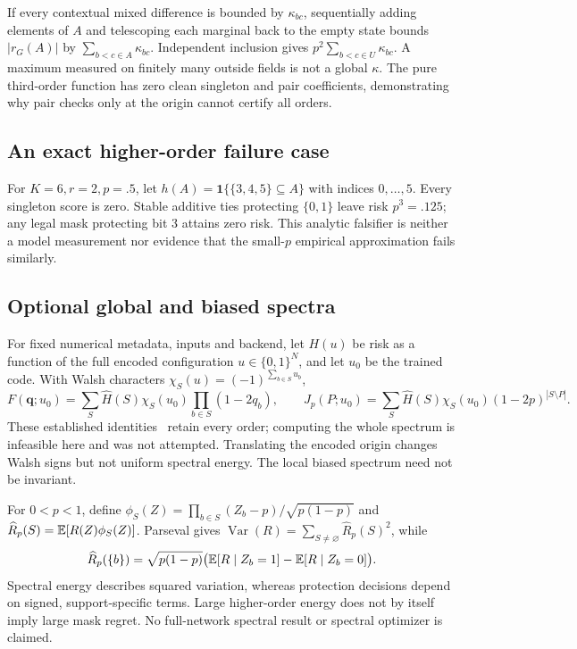 If every contextual mixed difference is bounded by $\kappa_{bc}$, sequentially adding elements of $A$ and telescoping each marginal back to the empty state bounds $|r_G(A)|$ by $\sum_{b<c\in A}\kappa_{bc}$. Independent inclusion gives $p^2\sum_{b<c\in U}\kappa_{bc}$. A maximum measured on finitely many outside fields is not a global $\kappa$. The pure third-order function has zero clean singleton and pair coefficients, demonstrating why pair checks only at the origin cannot certify all orders.

\subsection{An exact higher-order failure case}
For $K=6,r=2,p=.5$, let $h(A)=\mathbf1\{\{3,4,5\}\subseteq A\}$ with indices $0,\ldots,5$. Every singleton score is zero. Stable additive ties protecting $\{0,1\}$ leave risk $p^3=.125$; any legal mask protecting bit 3 attains zero risk. This analytic falsifier is neither a model measurement nor evidence that the small-$p$ empirical approximation fails similarly.

\subsection{Optional global and biased spectra}
For fixed numerical metadata, inputs and backend, let $H(u)$ be risk as a function of the full encoded configuration $u\in\{0,1\}^N$, and let $u_0$ be the trained code. With Walsh characters $\chi_S(u)=(-1)^{\sum_{b\in S}u_b}$,
\[
F(\mathbf q;u_0)=\sum_S\widehat H(S)\chi_S(u_0)\prod_{b\in S}(1-2q_b),\qquad
J_p(P;u_0)=\sum_S\widehat H(S)\chi_S(u_0)(1-2p)^{|S\setminus P|}.
\]
These established identities~\cite{odonnell2014analysis} retain every order; computing the whole spectrum is infeasible here and was not attempted. Translating the encoded origin changes Walsh signs but not uniform spectral energy. The local biased spectrum need not be invariant.

For $0<p<1$, define $\phi_S(Z)=\prod_{b\in S}(Z_b-p)/\sqrt{p(1-p)}$ and $\widehat R_p(S)=\mathbb{E}[R(Z)\phi_S(Z)]$. Parseval gives $\operatorname{Var}(R)=\sum_{S\ne\varnothing}\widehat R_p(S)^2$, while
\[
\widehat R_p(\{b\})=\sqrt{p(1-p)}
\bigl(\mathbb{E}[R\mid Z_b=1]-\mathbb{E}[R\mid Z_b=0]\bigr).
\]
Spectral energy describes squared variation, whereas protection decisions depend on signed, support-specific terms. Large higher-order energy does not by itself imply large mask regret. No full-network spectral result or spectral optimizer is claimed.
